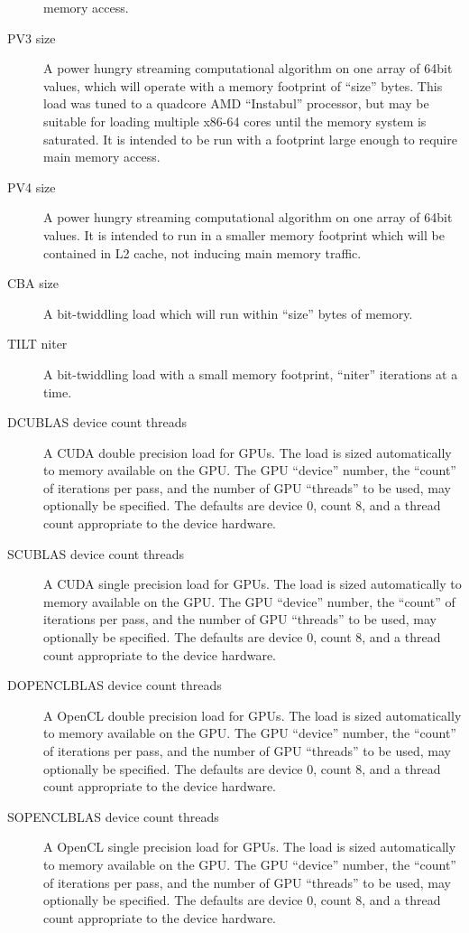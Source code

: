 \begin{description}
	                memory access.
	\item[PV3 size]  A power hungry streaming computational algorithm on one array of 64bit values, which will operate with a memory footprint of ``size'' bytes. This load was tuned to a quadcore AMD
		        ``Instabul'' processor, but may be suitable for loading multiple x86-64 cores until the memory system is saturated. It is intended to be run with a footprint large enough to require main
			memory access.
	\item[PV4 size]  A power hungry streaming computational algorithm on one array of 64bit values. It is intended to run in a smaller memory footprint which will be contained in L2 cache, not
	inducing main memory traffic. 
	\item[CBA size]  A bit-twiddling load which will run within ``size'' bytes of memory.
	\item[TILT niter]  A bit-twiddling load with a small memory footprint, ``niter'' iterations at a time.
	\item[DCUBLAS device count threads] A CUDA double precision load for GPUs. The load is sized automatically to memory available on the GPU. The GPU ``device'' number, the ``count''
	of iterations per pass, and the number of GPU ``threads'' to be used, may optionally be specified.  The defaults are device 0, count 8, and a thread count appropriate to the device hardware.
	\item[SCUBLAS device count threads] A CUDA single precision load for GPUs. The load is sized automatically to memory available on the GPU. The GPU ``device'' number, the ``count''
	of iterations per pass, and the number of GPU ``threads'' to be used, may optionally be specified.  The defaults are device 0, count 8, and a thread count appropriate to the device hardware.
        \item[DOPENCLBLAS device count threads] A OpenCL double precision load for GPUs. The load is sized automatically to memory available on the GPU. The GPU ``device'' number, the ``count''
        of iterations per pass, and the number of GPU ``threads'' to be used, may optionally be specified.  The defaults are device 0, count 8, and a thread count appropriate to the device hardware.
        \item[SOPENCLBLAS device count threads] A OpenCL single precision load for GPUs. The load is sized automatically to memory available on the GPU. The GPU ``device'' number, the ``count''
        of iterations per pass, and the number of GPU ``threads'' to be used, may optionally be specified.  The defaults are device 0, count 8, and a thread count appropriate to the device hardware.

\end{description}
